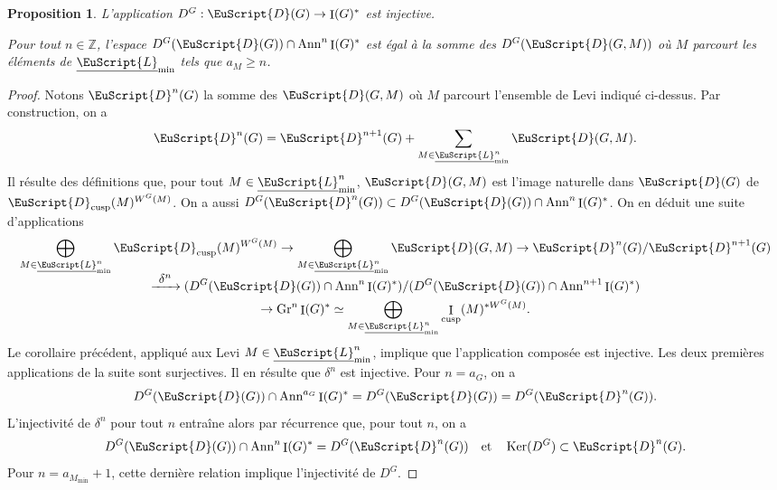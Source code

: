 \documentclass[JEP,XML,SOM,Unicode,francais]{cedram}
\let\mathcal \EuScript
\let\oldenumerate\enumerate
\renewcommand{\enumerate}{\oldenumerate\itemindent0pt}
\newenvironment{enumeratei}
{\bgroup\def\theenumi{\roman{enumi}}\def\theenumii{\arabic{enumii}}\oldenumerate}
{\endenumerate\egroup}
\newcommand{\quadet}{\quad\text{et}\quad}
\def\To#1{\mathchoice{\xrightarrow{\textstyle\kern4pt#1\kern3pt}}{\stackrel{#1}{\longrightarrow}}{}{}}
\newcommand{\Ann}{\mathrm{Ann}}
\newcommand{\cusp}{\mathrm{cusp}}
\newcommand{\Gr}{\mathrm{Gr}}
\DeclareMathOperator{\rI}{I}
\DeclareMathOperator{\Ker}{Ker}
\newcommand{\cD}{\mathcal{D}}
\newcommand{\cL}{\mathcal{L}}
\newcommand{\ZZ}{\mathbb{Z}}
\theoremstyle{plain}
\newtheorem*{prop*}{Proposition}
\theoremstyle{definition}
\begin{document}
\skpt
\begin{prop*}
\begin{enumeratei}
\item\label{injectivitei}
L'application $D^G:\cD(G)\to \rI(G)^*$ est injective.

\item\label{injectiviteii}
Pour tout $n\in \ZZ$, l'espace $D^G(\cD(G))\cap \Ann^n\rI(G)^*$ est égal à la somme des $D^G(\cD(G,M))$ où $M$ parcourt les éléments de $\underline{\cL}_{\min}$ tels que $a_{M}\geq n$.
\end{enumeratei}
\end{prop*}

\begin{proof}
Notons $\cD^n(G)$ la somme des $\cD(G,M)$ où $M$ parcourt l'ensemble de Levi indiqué ci-dessus. Par construction, on a
\[
\cD^n(G)=\cD^{n+1}(G)+\sum_{M\in \underline{\cL}^n_{\min}}\cD(G,M).
\]
Il résulte des définitions que, pour tout $M\in \underline{\cL}^n_{\min}$, $\cD(G,M)$ est l'image naturelle dans $\cD(G)$ de $\cD_{\cusp}(M)^{W^G(M)}$.
On a aussi $D^G(\cD^n(G))\subset D^G(\cD(G))\cap \Ann^n\rI(G)^*$. On en déduit une suite d'applications
\begin{multline*}
\bigoplus_{M\in \underline{\cL}^n_{\min}} \cD_{\cusp}(M)^{W^G(M)}\to \bigoplus_{M\in \underline{\cL}^n_{\min}}\cD(G,M)\to \cD^n(G)/\cD^{n+1}(G)\\[-5pt]
\To{\delta^n} (D^G(\cD(G))\cap \Ann^n\rI(G)^*)/(D^G(\cD(G))\cap \Ann^{n+1}\rI(G)^*)\\
\to \Gr^n\rI(G)^*\simeq \bigoplus_{M\in \underline{\cL}^n_{\min}}\rI_{\cusp}(M)^{*W^G(M)}.
\end{multline*}
Le corollaire précédent, appliqué aux Levi $M\in\underline{\cL}_{\min}^n$, implique que l'application composée est injective. Les deux premières applications de la suite sont surjectives. Il en résulte que $\delta^{n}$ est injective. Pour $n=a_{G}$, on a
\[
D^G(\cD(G))\cap \Ann^{a_{G}}\rI(G)^*=D^G(\cD(G))=D^G(\cD^n(G)).
\]
L'injectivité de $\delta^{n}$ pour tout $n$ entraîne alors par récurrence que, pour tout $n$, on a
\[
D^G(\cD(G))\cap \Ann^n\rI(G)^*=D^G(\cD^n(G))\quadet \Ker(D^G)\subset \cD^n(G).
\]
Pour $n=a_{M_{\min}}+1$, cette dernière relation implique l'injectivité de $D^G$.
\end{proof}
\end{document}
